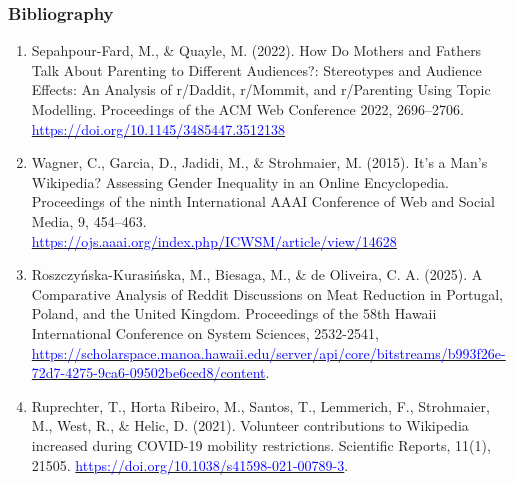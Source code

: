 \documentclass[aspectratio=169]{beamer}
\begin{document}
\begin{frame}
    \frametitle{Bibliography}
    \tiny
    \begin{enumerate}
        \item Sepahpour-Fard, M., \& Quayle, M. (2022). How Do Mothers and Fathers Talk About Parenting to Different Audiences?: Stereotypes and Audience Effects: An Analysis of r/Daddit, r/Mommit, and r/Parenting Using Topic Modelling. Proceedings of the ACM Web Conference 2022, 2696–2706. \href{https://doi.org/10.1145/3485447.3512138}{\textcolor{blue}{https://doi.org/10.1145/3485447.3512138}}
        \item Wagner, C., Garcia, D., Jadidi, M., \& Strohmaier, M. (2015). It’s a Man’s Wikipedia? Assessing Gender Inequality in an Online Encyclopedia. Proceedings of the ninth International AAAI Conference of Web and Social Media, 9, 454–463. \href{https://ojs.aaai.org/index.php/ICWSM/article/view/14628}{\textcolor{blue}{https://ojs.aaai.org/index.php/ICWSM/article/view/14628}}
        \item Roszczyńska-Kurasińska, M., Biesaga, M., \& de Oliveira, C. A. (2025). A Comparative Analysis of Reddit Discussions on Meat Reduction in Portugal, Poland, and the United Kingdom. Proceedings of the 58th Hawaii International Conference on System Sciences, 2532-2541, \href{https://scholarspace.manoa.hawaii.edu/server/api/core/bitstreams/b993f26e-72d7-4275-9ca6-09502be6ced8/content}{\textcolor{blue}{https://scholarspace.manoa.hawaii.edu/server/api/core/bitstreams/b993f26e-72d7-4275-9ca6-09502be6ced8/content}}.
        \item Ruprechter, T., Horta Ribeiro, M., Santos, T., Lemmerich, F., Strohmaier, M., West, R., \& Helic, D. (2021). Volunteer contributions to Wikipedia increased during COVID-19 mobility restrictions. Scientific Reports, 11(1), 21505. \href{https://doi.org/10.1038/s41598-021-00789-3}{\textcolor{blue}{https://doi.org/10.1038/s41598-021-00789-3}}.
    \end{enumerate}
    
\end{frame}
\end{document}
